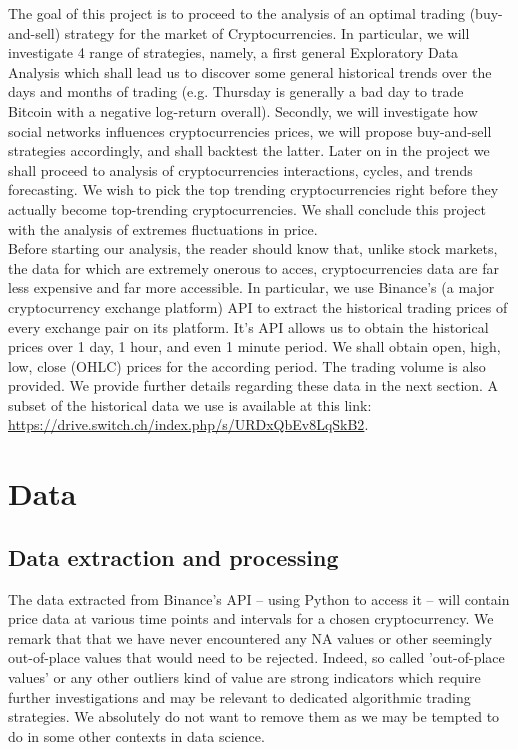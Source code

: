 \documentclass[twoside]{report}
\begin{document}
\begin{spacing}{1}
The goal of this project is to proceed to the analysis of an optimal trading (buy-and-sell) strategy for the market of Cryptocurrencies. In particular, we will investigate 4 range of strategies, namely, a first general Exploratory Data Analysis which shall lead us to discover some general historical trends over the days and months of trading (e.g. Thursday is generally a bad day to trade Bitcoin with a negative log-return overall). Secondly, we will investigate how social networks influences cryptocurrencies prices, we will propose buy-and-sell strategies accordingly, and shall backtest the latter. Later on in the project we shall proceed to analysis of cryptocurrencies interactions, cycles, and trends forecasting. We wish to pick the top trending cryptocurrencies right before they actually become top-trending cryptocurrencies. We shall conclude this project with the analysis of extremes fluctuations in price. \\

Before starting our analysis, the reader should know that, unlike stock markets, the data for which are extremely onerous to acces, cryptocurrencies data are far less expensive and far more accessible. In particular, we use Binance's (a major cryptocurrency exchange platform) API to extract the historical trading prices of every exchange pair on its platform. It's API allows us to obtain the historical prices over 1 day, 1 hour, and even 1 minute period. We shall obtain open, high, low, close (OHLC) prices for the according period. The trading volume is also provided. We provide further details regarding these data in the next section. A subset of the historical data we use is available at this link: \url{https://drive.switch.ch/index.php/s/URDxQbEv8LqSkB2}.


\section{Data}
\subsection{Data extraction and processing}
The data extracted from Binance's API -- using Python to access it -- will contain price data at various time points and intervals for a chosen cryptocurrency. We remark that that we have never encountered any NA values or other seemingly out-of-place values that would need to be rejected. Indeed, so called 'out-of-place values' or any other outliers kind of value are strong indicators which require further investigations and may be relevant to dedicated algorithmic trading strategies. We absolutely do not want to remove them as we may be tempted to do in some other contexts in data science.\\


\end{spacing}
\end{document}
